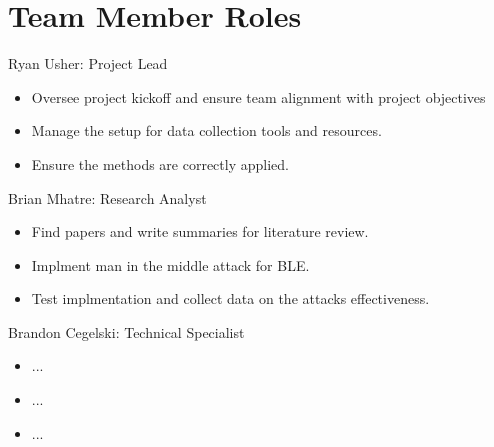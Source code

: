 \documentclass{article}
\begin{document}
    \section{Team Member Roles}

Ryan Usher: Project Lead
\begin{itemize}
    \item Oversee project kickoff and ensure team alignment with project objectives
    \item Manage the setup for data collection tools and resources.
    \item Ensure the methods are correctly applied.

\end{itemize}

Brian Mhatre: Research Analyst
\begin{itemize}
    \item Find papers and write summaries for literature review.
    \item Implment man in the middle attack for BLE.
    \item Test implmentation and collect data on the attacks effectiveness.
\end{itemize}

Brandon Cegelski: Technical Specialist
\begin{itemize}
    \item ...
    \item ...
    \item ...
\end{itemize}
\end{document}

